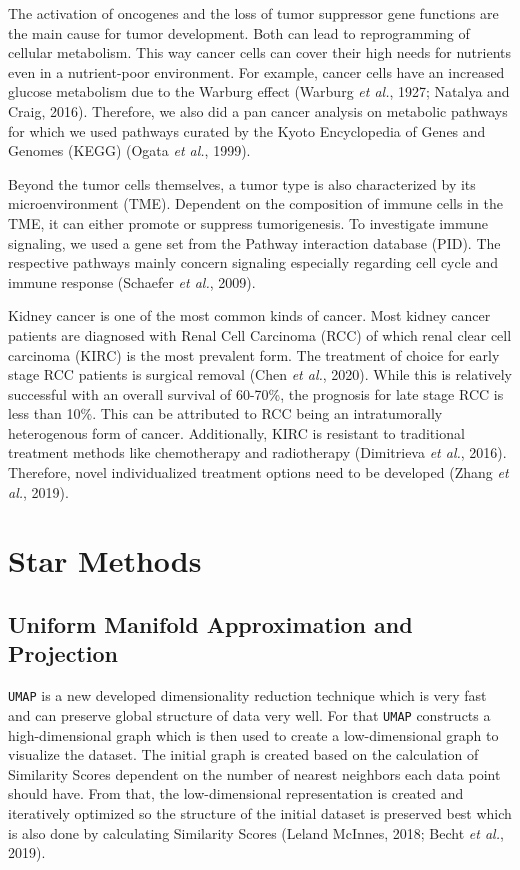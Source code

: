 \documentclass[
  parskip,
  oneside]{scrreprt}
\begin{document}
The activation of oncogenes and the loss of tumor suppressor gene
functions are the main cause for tumor development. Both can lead to
reprogramming of cellular metabolism. This way cancer cells can cover
their high needs for nutrients even in a nutrient-poor environment. For
example, cancer cells have an increased glucose metabolism due to the
Warburg effect (Warburg \emph{et al.}, 1927; Natalya and Craig, 2016).
Therefore, we also did a pan cancer analysis on metabolic pathways for
which we used pathways curated by the Kyoto Encyclopedia of Genes and
Genomes (KEGG) (Ogata \emph{et al.}, 1999).

Beyond the tumor cells themselves, a tumor type is also characterized by
its microenvironment (TME). Dependent on the composition of immune cells
in the TME, it can either promote or suppress tumorigenesis. To
investigate immune signaling, we used a gene set from the Pathway
interaction database (PID). The respective pathways mainly concern
signaling especially regarding cell cycle and immune response (Schaefer
\emph{et al.}, 2009).

Kidney cancer is one of the most common kinds of cancer. Most kidney
cancer patients are diagnosed with Renal Cell Carcinoma (RCC) of which
renal clear cell carcinoma (KIRC) is the most prevalent form. The
treatment of choice for early stage RCC patients is surgical removal
(Chen \emph{et al.}, 2020). While this is relatively successful with an
overall survival of 60-70\%, the prognosis for late stage RCC is less
than 10\%. This can be attributed to RCC being an intratumorally
heterogenous form of cancer. Additionally, KIRC is resistant to
traditional treatment methods like chemotherapy and radiotherapy
(Dimitrieva \emph{et al.}, 2016). Therefore, novel individualized
treatment options need to be developed (Zhang \emph{et al.}, 2019).

\hypertarget{star-methods}{%
\section{Star Methods}\label{star-methods}}

\hypertarget{uniform-manifold-approximation-and-projection}{%
\subsection{Uniform Manifold Approximation and
Projection}\label{uniform-manifold-approximation-and-projection}}

\texttt{UMAP} is a new developed dimensionality reduction technique
which is very fast and can preserve global structure of data very well.
For that \texttt{UMAP} constructs a high-dimensional graph which is then
used to create a low-dimensional graph to visualize the dataset. The
initial graph is created based on the calculation of Similarity Scores
dependent on the number of nearest neighbors each data point should
have. From that, the low-dimensional representation is created and
iteratively optimized so the structure of the initial dataset is
preserved best which is also done by calculating Similarity Scores
(Leland McInnes, 2018; Becht \emph{et al.}, 2019).
\end{document}
